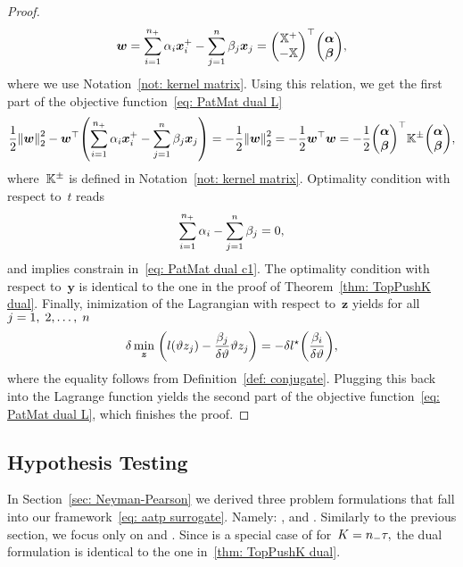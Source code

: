 \begin{proof}
  \begin{equation*}
    \bm{w}
        = \sum_{i = 1}^{\npos} \alpha_i \bm{x}^+_i - \sum_{j = 1}^{\nall} \beta_j \bm{x}_j
        = \Matrix{\X^+ \\ - \X}^\top \vecab,
  \end{equation*}
  where we use Notation~\ref{not: kernel matrix}. Using this relation, we get the first part of the objective function~\eqref{eq: PatMat dual L} 
  \begin{equation*}
    \frac{1}{2} \norm{\bm{w}}_{2}^{2} - \bm{w}^{\top} \Brac{\sum_{i = 1}^{\npos} \alpha_i \bm{x}^+_i - \sum_{j = 1}^{\nall} \beta_j \bm{x}_j}
      = - \frac{1}{2} \norm{\bm{w}}_{2}^{2}
      = - \frac{1}{2} \bm{w}^{\top} \bm{w}
      = - \frac{1}{2} \vecab^{\top} \Kall \vecab,
  \end{equation*}
  where~$\mathbb{K}^{\pm}$ is defined in Notation~\ref{not: kernel matrix}. Optimality condition with respect to~$t$ reads 
  \begin{equation*}
    \sum_{i = 1}^{n_{+}} \alpha_i - \sum_{j = 1}^{n} \beta_j = 0,
  \end{equation*}
  and implies constrain in~\eqref{eq: PatMat dual c1}. The optimality condition with respect to~$\bm{y}$ is identical to the one in the proof of Theorem~\ref{thm: TopPushK dual}. Finally, inimization of the Lagrangian with respect to~$\bm{z}$ yields for all $j = 1, \; 2, \ldots, \; n$ 
  \begin{equation*}
    \delta \min_{\bm{z}} \; \Brac{l(\vartheta z_j) - \frac{\beta_j}{\delta\vartheta } \vartheta z_j} = - \delta l^{\star} \Brac{\frac{\beta_i}{\delta\vartheta }},
  \end{equation*}
  where the equality follows from Definition~\ref{def: conjugate}. Plugging this back into the Lagrange function yields the second part of the objective function~\eqref{eq: PatMat dual L}, which finishes the proof.
\end{proof}

\subsection{Hypothesis Testing}

In Section~\ref{sec: Neyman-Pearson} we derived three problem formulations that fall into our framework~\eqref{eq: aatp surrogate}. Namely: \GrillNP, \tauFPL and \PatMatNP. Similarly to the previous section, we focus only on \tauFPL and \PatMatNP. Since \tauFPL is a special case of \TopPushK for~$K = n_{-} \tau,$ the dual formulation is identical to the one in~\ref{thm: TopPushK dual}.

